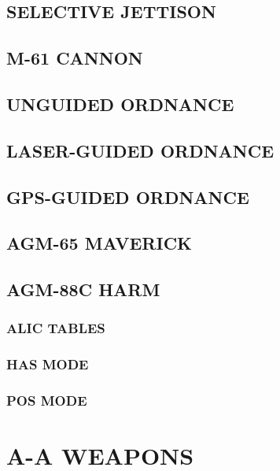 \documentclass[fontInter]{TechCheck}
\begin{document}
	\section{SELECTIVE JETTISON}

	\clearpage

	\section{M-61 CANNON}

	\clearpage 

	\section{UNGUIDED ORDNANCE}

	\clearpage 

	\section{LASER-GUIDED ORDNANCE}

	\clearpage 

	\section{GPS-GUIDED ORDNANCE}

	\clearpage

	\section{AGM-65 MAVERICK}

	\clearpage 

	\section{AGM-88C HARM}

	\subsection{ALIC TABLES}
	\subsection{HAS MODE}
	\subsection{POS MODE}

	\cleardoublepage

	\chapter{A-A WEAPONS}
	\minitoc
	\cleardoublepage
\end{document}
